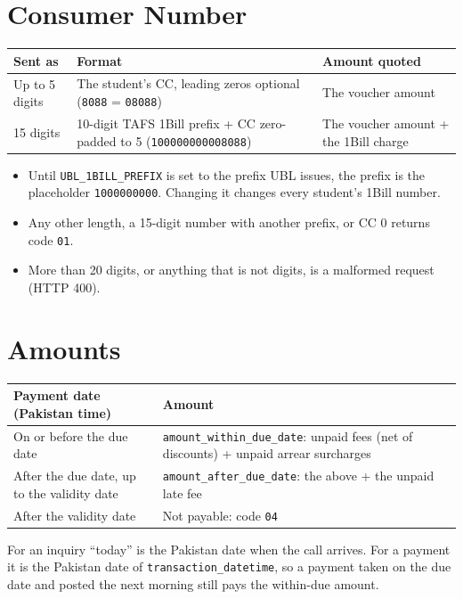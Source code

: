 \documentclass[11pt]{article}
\begin{document}
\section{Consumer Number}\label{sec:consumer}
\begin{center}
\begin{tabularx}{\textwidth}{@{}P{0.18\textwidth} L P{0.28\textwidth}@{}}
\toprule
\textbf{Sent as} & \textbf{Format} & \textbf{Amount quoted} \\
\midrule
Up to 5 digits & The student's CC, leading zeros optional (\texttt{8088} = \texttt{08088}) & The voucher amount \\
15 digits & 10-digit TAFS 1Bill prefix + CC zero-padded to 5 (\texttt{100000000008088}) & The voucher amount + the 1Bill charge \\
\bottomrule
\end{tabularx}
\end{center}
\begin{itemize}[nosep]
  \item Until \texttt{UBL\_1BILL\_PREFIX} is set to the prefix UBL issues, the prefix is the placeholder
        \texttt{1000000000}. Changing it changes every student's 1Bill number.
  \item Any other length, a 15-digit number with another prefix, or CC 0 returns code \texttt{01}.
  \item More than 20 digits, or anything that is not digits, is a malformed request (HTTP 400).
\end{itemize}

\section{Amounts}\label{sec:amounts}
\begin{center}
\begin{tabularx}{\textwidth}{@{}P{0.33\textwidth} L@{}}
\toprule
\textbf{Payment date (Pakistan time)} & \textbf{Amount} \\
\midrule
On or before the due date & \texttt{amount\_within\_due\_date}: unpaid fees (net of discounts) + unpaid arrear surcharges \\
After the due date, up to the validity date & \texttt{amount\_after\_due\_date}: the above + the unpaid late fee \\
After the validity date & Not payable: code \texttt{04} \\
\bottomrule
\end{tabularx}
\end{center}
For an inquiry ``today'' is the Pakistan date when the call arrives. For a payment it is the Pakistan date of
\texttt{transaction\_datetime}, so a payment taken on the due date and posted the next morning still pays the
within-due amount.
\end{document}
